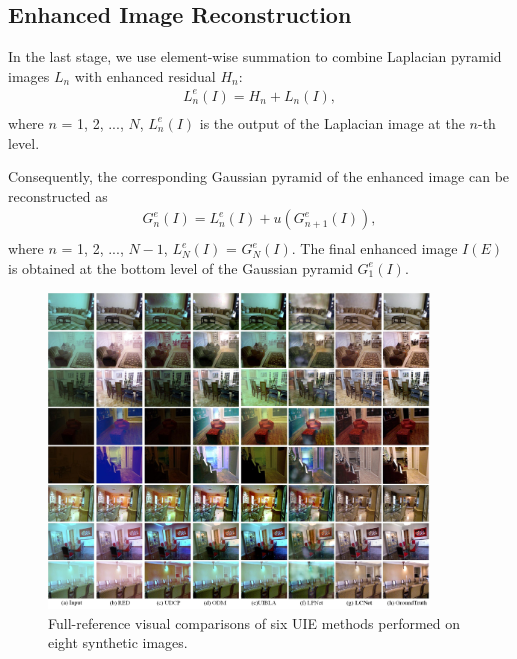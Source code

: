 \documentclass[journal]{IEEEtran}
\begin{document}
\subsection{Enhanced Image Reconstruction}
In the last stage, we use element-wise summation to combine Laplacian pyramid images \(L_{n}\) with enhanced residual \(H_{n}\): 
\begin{equation}
\begin{aligned}
L_{n}^{e}(I)=H_{n}+L_{n}(I),\\
\end{aligned}
\label{equation6} 
\end{equation}
where \(n\) = 1, 2, ..., \(N\), \(L_{n}^{e}(I)\) is the output of the Laplacian image at the \(n\)-th level.

Consequently, the corresponding Gaussian pyramid of the enhanced image can be reconstructed as
\begin{equation}
\begin{aligned}
G_{n}^{e}(I)=L_{n}^{e}(I)+u(G_{n+1}^{e}(I)),\\
\end{aligned}
\label{equation6} 
\end{equation}
where \(n\) = 1, 2, ..., \(N-1\), \(L_{N}^{e}(I)\) = \(G_{N}^{e}(I)\). The final enhanced image  \(I(E)\) is obtained at the bottom level of the Gaussian pyramid \(G_{1}^{e}(I)\).



\begin{figure}[h] 
\centering 
{   
\includegraphics[width=0.9\textwidth]{Figs/Fig5.jpg}

}          
\caption{Full-reference visual comparisons of six UIE methods performed on eight synthetic images.}
\label{Fig5} 
\end{figure} 
\end{document}
